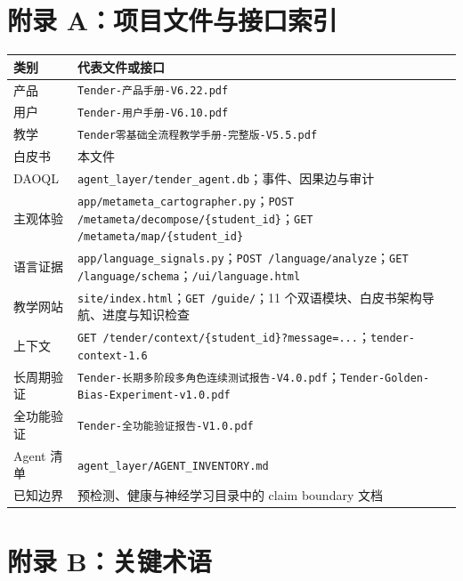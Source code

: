 \documentclass[UTF8,a4paper,11pt]{ctexart}
\begin{document}
\newpage
\appendix
\section{附录 A：项目文件与接口索引}

\begin{center}
\begin{longtable}{@{}p{4.2cm}p{8.8cm}@{}}
\toprule
\textbf{类别} & \textbf{代表文件或接口} \\
\midrule
产品 & \texttt{Tender-产品手册-V6.22.pdf} \\
用户 & \texttt{Tender-用户手册-V6.10.pdf} \\
教学 & \texttt{Tender零基础全流程教学手册-完整版-V5.5.pdf} \\
白皮书 & 本文件 \\
DAOQL & \texttt{agent\_layer/tender\_agent.db}；事件、因果边与审计 \\
主观体验 & \texttt{app/metameta\_cartographer.py}；\texttt{POST /metameta/decompose/\{student\_id\}}；\texttt{GET /metameta/map/\{student\_id\}} \\
语言证据 & \texttt{app/language\_signals.py}；\texttt{POST /language/analyze}；\texttt{GET /language/schema}；\texttt{/ui/language.html} \\
教学网站 & \texttt{site/index.html}；\texttt{GET /guide/}；11 个双语模块、白皮书架构导航、进度与知识检查 \\
上下文 & \texttt{GET /tender/context/\{student\_id\}?message=...}；\texttt{tender-context-1.6} \\
长周期验证 & \texttt{Tender-长期多阶段多角色连续测试报告-V4.0.pdf}；\texttt{Tender-Golden-Bias-Experiment-v1.0.pdf} \\
全功能验证 & \texttt{Tender-全功能验证报告-V1.0.pdf} \\
Agent 清单 & \texttt{agent\_layer/AGENT\_INVENTORY.md} \\
已知边界 & 预检测、健康与神经学习目录中的 claim boundary 文档 \\
\bottomrule
\end{longtable}
\end{center}

\section{附录 B：关键术语}
\end{document}
